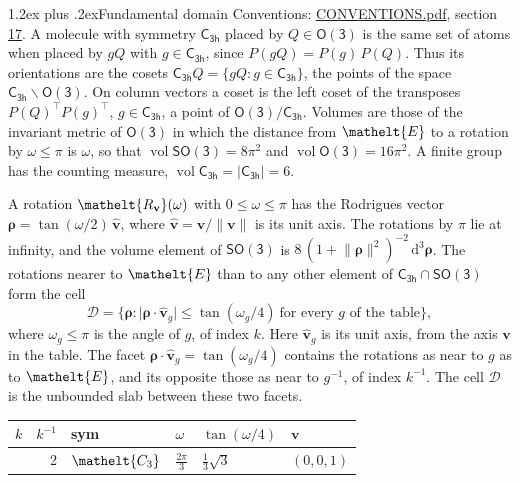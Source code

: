 \documentclass[10pt,a4paper]{article}
\makeatletter
\renewcommand\section{\@startsection{section}{1}{\z@}{-3ex plus -1ex minus -.2ex}%
  {1.2ex plus .2ex}{\normalfont\large\sffamily\bfseries\color{parttitle}}}
\numberwithin{equation}{section}
\newcommand{\eltfont}[1]{{\let\sigma\eltsigma\mathelt{#1}}}
\newcommand{\grp}[1]{\mathsf{#1}}
\newcommand{\cls}[1]{\eltfont{#1}}
\newcommand{\elt}[1]{\eltfont{#1}}
\newcommand{\dirvec}[3]{(#1, #2, #3)}
\newcommand{\unitaxis}{\hat{\mathbf{v}}}
\newcommand{\vv}{\mathbf{v}}
\newcommand{\diff}{\mathrm{d}}
\newcommand{\vol}{\operatorname{vol}}
\newcommand{\rodrigues}{\boldsymbol{\rho}}
\newcommand{\fcell}{\mathcal{D}}
\makeatother
\begin{document}
\section{Fundamental domain}\label{s:fundamental_domain}
Conventions: \href{../../CONVENTIONS.pdf}{CONVENTIONS.pdf}, section \href{../../CONVENTIONS.pdf\#conv.17}{17}.
\leavevmode\label{n:element.placement}A molecule with symmetry $\grp{C_{3h}}$ placed by $Q \in \grp{O(3)}$ is the same set of atoms when placed by $gQ$ with $g \in \grp{C_{3h}}$, since $P(gQ) = P(g)\,P(Q)$. \label{n:operator.cosets}Thus its orientations are the cosets $\grp{C_{3h}}Q = \{gQ : g \in \grp{C_{3h}}\}$, the points of the space $\grp{C_{3h}}\backslash\grp{O(3)}$. On column vectors a coset is the left coset of the transposes $P(Q)^{\top}P(g)^{\top}$, $g \in \grp{C_{3h}}$, a point of $\grp{O(3)}/\grp{C_{3h}}$.
\leavevmode\label{n:operator.volume}Volumes are those of the invariant metric of \href{O3.pdf}{$\grp{O(3)}$} in which the distance from $\elt{E}$ to a rotation by $\omega \le \pi$ is $\omega$, so that $\vol\grp{SO(3)} = 8\pi^2$ and $\vol\grp{O(3)} = 16\pi^2$. A finite group has the counting measure, $\vol\grp{C_{3h}} = |\grp{C_{3h}}| = 6$.

\leavevmode\label{n:vector.rodrigues}\label{n:vector.unitaxis}A rotation $\elt{R_{\vv}}(\omega)$ with $0 \le \omega \le \pi$ has the Rodrigues vector $\rodrigues = \tan(\omega/2)\,\unitaxis$, where $\unitaxis = \vv/\lVert\vv\rVert$ is its unit axis. The rotations by $\pi$ lie at infinity, and the volume element of \href{SO3.pdf}{$\grp{SO(3)}$} is $8\,(1 + \lVert\rodrigues\rVert^2)^{-2}\,\diff^3\rodrigues$.
\leavevmode\label{n:set.cell}The rotations nearer to $\elt{E}$ than to any other element of $\grp{C_{3h}} \cap \grp{SO(3)}$ form the cell
\begin{equation}\label{e:cell}\fcell = \bigl\{\rodrigues : \lvert\rodrigues\cdot\unitaxis_g\rvert \le \tan(\omega_g/4)\ \text{for every $g$ of the table}\bigr\},\end{equation}
where $\omega_g \le \pi$ is the angle of $g$, of index $k$. Here $\unitaxis_g$ is its unit axis, from the axis $\vv$ in the table. The facet $\rodrigues\cdot\unitaxis_g = \tan(\omega_g/4)$ contains the rotations as near to $g$ as to $\elt{E}$, and its opposite those as near to $g^{-1}$, of index $k^{-1}$. The cell $\fcell$ is the unbounded slab between these two facets.
{\small{\renewcommand{\arraystretch}{1.3}\begin{longtable}{@{}rrllll@{}}\toprule
$k$ & $k^{-1}$ & sym & $\omega$ & $\tan(\omega/4)$ & $\vv$\\\midrule\endhead
\bottomrule\endfoot\endlastfoot
1 & 2 & $\cls{C_{3}}$ & $\tfrac{2\pi}{3}$ & $\tfrac{1}{3}\sqrt{3}$ & $\dirvec{0}{0}{1}$\\
\bottomrule\end{longtable}}}
\end{document}
